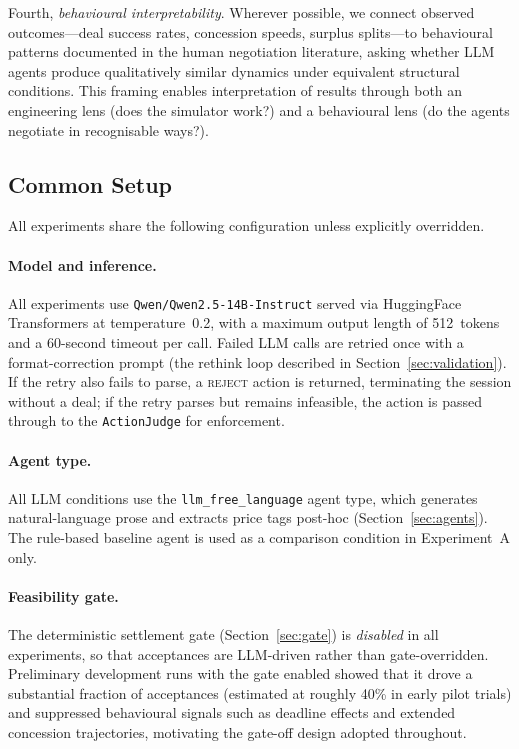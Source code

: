 Fourth, \emph{behavioural interpretability}.  Wherever possible, we connect observed outcomes---deal success rates, concession speeds, surplus splits---to behavioural patterns documented in the human negotiation literature, asking whether LLM agents produce qualitatively similar dynamics under equivalent structural conditions.  This framing enables interpretation of results through both an engineering lens (does the simulator work?) and a behavioural lens (do the agents negotiate in recognisable ways?).

\subsection{Common Setup}
\label{sec:common-setup}

All experiments share the following configuration unless explicitly overridden.

\paragraph{Model and inference.}
All experiments use \texttt{Qwen/Qwen2.5-14B-Instruct} served via HuggingFace Transformers at temperature~0.2, with a maximum output length of 512~tokens and a 60-second timeout per call.  Failed LLM calls are retried once with a format-correction prompt (the rethink loop described in Section~\ref{sec:validation}).  If the retry also fails to parse, a \textsc{reject} action is returned, terminating the session without a deal; if the retry parses but remains infeasible, the action is passed through to the \texttt{ActionJudge} for enforcement.

\paragraph{Agent type.}
All LLM conditions use the \texttt{llm\_free\_language} agent type, which generates natural-language prose and extracts price tags post-hoc (Section~\ref{sec:agents}).  The rule-based baseline agent is used as a comparison condition in Experiment~A only.

\paragraph{Feasibility gate.}
The deterministic settlement gate (Section~\ref{sec:gate}) is \emph{disabled} in all experiments, so that acceptances are LLM-driven rather than gate-overridden.  Preliminary development runs with the gate enabled showed that it drove a substantial fraction of acceptances (estimated at roughly 40\% in early pilot trials) and suppressed behavioural signals such as deadline effects and extended concession trajectories, motivating the gate-off design adopted throughout.

